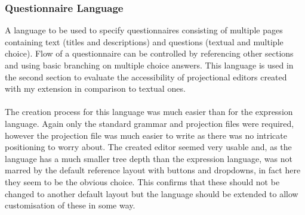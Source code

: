 \documentclass{article}
\begin{document}

\subsubsection{Questionnaire Language}\label{questionnaireLang}
A language to be used to specify questionnaires consisting of multiple pages containing text (titles and descriptions) and questions (textual and multiple choice). Flow of a questionnaire can be controlled by referencing other sections and using basic branching on multiple choice answers. This language is used in the second section to evaluate the accessibility of projectional editors created with my extension in comparison to textual ones.
\\
\\
The creation process for this language was much easier than for the expression language. Again only the standard grammar and projection files were required, however the projection file was much easier to write as there was no intricate positioning to worry about. The created editor seemed very usable and, as the language has a much smaller tree depth than the expression language, was not marred by the default reference layout with buttons and dropdowns, in fact here they seem to be the obvious choice. This confirms that these should not be changed to another default layout but the language should be extended to allow customisation of these in some way.


\end{document}
